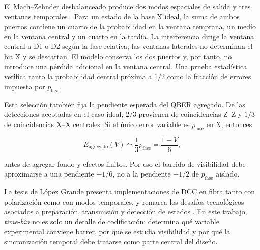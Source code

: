 El Mach--Zehnder desbalanceado produce dos modos espaciales de salida y tres ventanas temporales \cite{rusca2018simplified}. Para un estado de la base X ideal, la suma de ambos puertos contiene un cuarto de la probabilidad en la ventana temprana, un medio en la ventana central y un cuarto en la tardía. La interferencia dirige la ventana central a D1 o D2 según la fase relativa; las ventanas laterales no determinan el bit X y se descartan. El modelo conserva los dos puertos y, por tanto, no introduce una pérdida adicional en la ventana central. Una prueba estadística verifica tanto la probabilidad central próxima a \(1/2\) como la fracción de errores impuesta por \(p_\text{fase}\).

Esta selección también fija la pendiente esperada del QBER agregado. De las detecciones aceptadas en el caso ideal, \(2/3\) provienen de coincidencias Z--Z y \(1/3\) de coincidencias X--X centrales. Si el único error variable es \(p_\text{fase}\) en X, entonces

\begin{equation}
  E_\text{agregado}(V)
  \simeq \frac{1}{3}p_\text{fase}
  = \frac{1-V}{6},
  \label{eq:qber_visibility_weighted}
\end{equation}

antes de agregar fondo y efectos finitos. Por eso el barrido de visibilidad debe aproximarse a una pendiente \(-1/6\), no a la pendiente \(-1/2\) de \(p_\text{fase}\) aislado.

La tesis de López Grande presenta implementaciones de DCC en fibra tanto con polarización como con modos temporales, y remarca los desafíos tecnológicos asociados a preparación, transmisión y detección de estados \cite{lopezGrande2018}. En este trabajo, \textit{time-bin} no es solo un detalle de codificación: determina qué variable experimental conviene barrer, por qué se estudia visibilidad y por qué la sincronización temporal debe tratarse como parte central del diseño.

